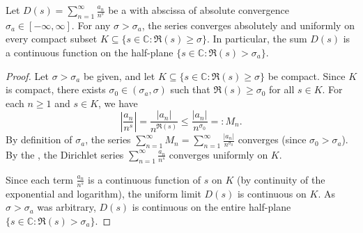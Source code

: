 \begin{proposition}
\label{proposition:uniform_convergence_of_dirichlet_series_on_compact_subsets}
Let $D(s) = \sum_{n=1}^\infty \frac{a_n}{n^s}$ be a  with abscissa of absolute convergence $\sigma_a \in [-\infty, \infty]$.
For any $\sigma > \sigma_a$, the series converges absolutely and uniformly on every compact subset $K \subseteq \{ s \in \mathbb{C} : \Re(s) \ge \sigma \}$.
In particular, the sum $D(s)$ is a continuous function on the half-plane $\{ s \in \mathbb{C} : \Re(s) > \sigma_a \}$.
\end{proposition}
\begin{proof}
Let $\sigma > \sigma_a$ be given, and let $K \subseteq \{ s \in \mathbb{C} : \Re(s) \ge \sigma \}$ be compact.
Since $K$ is compact, there exists $\sigma_0 \in (\sigma_a, \sigma)$ such that $\Re(s) \ge \sigma_0$ for all $s \in K$.
For each $n \ge 1$ and $s \in K$, we have
$$\left| \frac{a_n}{n^s} \right| = \frac{|a_n|}{n^{\Re(s)}} \le \frac{|a_n|}{n^{\sigma_0}} =: M_n.$$
By definition of $\sigma_a$, the series $\sum_{n=1}^\infty M_n = \sum_{n=1}^\infty \frac{|a_n|}{n^{\sigma_0}}$ converges (since $\sigma_0 > \sigma_a$).
By the , the Dirichlet series $\sum_{n=1}^\infty \frac{a_n}{n^s}$ converges uniformly on $K$.

Since each term $\frac{a_n}{n^s}$ is a continuous function of $s$ on $K$ (by continuity of the exponential and logarithm), the uniform limit $D(s)$ is continuous on $K$.
As $\sigma > \sigma_a$ was arbitrary, $D(s)$ is continuous on the entire half-plane $\{ s \in \mathbb{C} : \Re(s) > \sigma_a \}$.
\end{proof}
